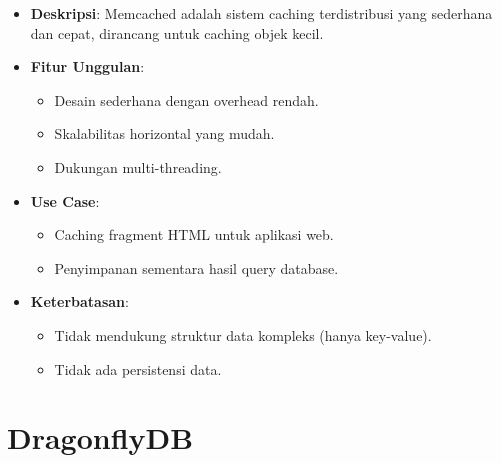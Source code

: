 \documentclass[11pt, a4paper]{book}
\begin{document}
	\begin{itemize}
		\item \textbf{Deskripsi}:  
		Memcached adalah sistem caching terdistribusi yang sederhana dan cepat, dirancang untuk caching objek kecil.
		
		\item \textbf{Fitur Unggulan}:
		\begin{itemize}
			\item Desain sederhana dengan overhead rendah.
			\item Skalabilitas horizontal yang mudah.
			\item Dukungan multi-threading.
		\end{itemize}
		
		\item \textbf{Use Case}:
		\begin{itemize}
			\item Caching fragment HTML untuk aplikasi web.
			\item Penyimpanan sementara hasil query database.
		\end{itemize}
		
		\item \textbf{Keterbatasan}:
		\begin{itemize}
			\item Tidak mendukung struktur data kompleks (hanya key-value).
			\item Tidak ada persistensi data.
		\end{itemize}
	\end{itemize}
	
	\section{DragonflyDB}
	\label{sec:dragonflydb}
	
\end{document}

